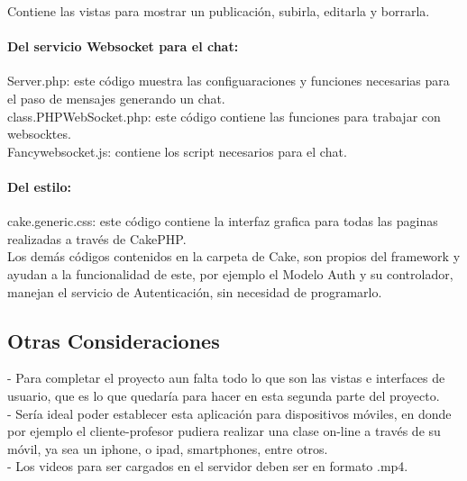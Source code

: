 \documentclass[12pt]{article}
\begin{document}
Contiene las vistas para mostrar un publicación, subirla, editarla y borrarla.\\

\paragraph{Del servicio Websocket para el chat:\\}

Server.php: este código muestra las configuaraciones y funciones necesarias para el paso de mensajes 
generando un chat.\\

class.PHPWebSocket.php: este código contiene las funciones para trabajar con websocktes.\\

Fancywebsocket.js: contiene los script necesarios para el chat.\\

\paragraph{Del estilo:\\}

cake.generic.css: este código contiene la interfaz grafica para todas las paginas realizadas a través de CakePHP.\\

Los demás códigos contenidos en la carpeta de Cake, son propios del framework y ayudan a la funcionalidad de este, 
por ejemplo el Modelo Auth y su controlador, manejan el servicio de Autenticación, sin necesidad de programarlo.\\

\subsection{Otras Consideraciones}
-	Para completar el proyecto aun falta todo lo que son las vistas e interfaces de usuario, que es lo que quedaría 
para hacer en esta segunda parte del proyecto.\\

-	Sería ideal poder establecer esta aplicación para dispositivos móviles, en donde por ejemplo el 
cliente-profesor pudiera realizar una clase on-line a través de su móvil, ya sea un iphone, o ipad, smartphones, entre otros.\\

-	Los videos para ser cargados en el servidor deben ser en formato .mp4.\\
\end{document}
